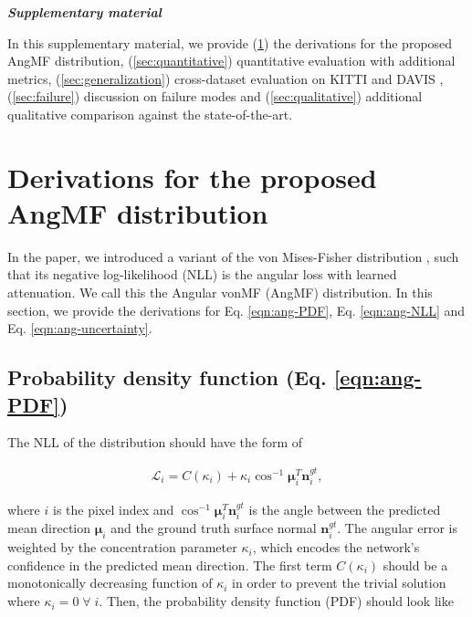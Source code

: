 \documentclass[10pt,twocolumn,letterpaper]{article}
\begin{document}
{\small


}

\appendix
\onecolumn

\noindent
\textit{\textbf{\large Supplementary material}}

\noindent
In this supplementary material, we provide (\ref{sec:derivation}) the derivations for the proposed AngMF distribution, (\ref{sec:quantitative}) quantitative evaluation with additional metrics, (\ref{sec:generalization}) cross-dataset evaluation on KITTI \cite{KITTI} and DAVIS \cite{DAVIS}, (\ref{sec:failure}) discussion on failure modes and (\ref{sec:qualitative}) additional qualitative comparison against the state-of-the-art.


\section{Derivations for the proposed AngMF distribution}
\label{sec:derivation}

In the paper, we introduced a variant of the von Mises-Fisher distribution \cite{fisher1993statistical}, such that its negative log-likelihood (NLL) is the angular loss with learned attenuation. We call this the Angular vonMF (AngMF) distribution. In this section, we provide the derivations for Eq. \ref{eqn:ang-PDF}, Eq. \ref{eqn:ang-NLL} and Eq. \ref{eqn:ang-uncertainty}.

\subsection{Probability density function (Eq. \ref{eqn:ang-PDF})}

The NLL of the distribution should have the form of

\begin{equation}
\begin{aligned}
\label{eqn:supp_new_nll}
\mathcal{L}_i = C(\kappa_i) + \kappa_i \cos^{-1} \boldsymbol{\mu}_i^T \mathbf{n}_i^{gt},
\end{aligned}
\end{equation}

\noindent
where $i$ is the pixel index and $\cos^{-1} \boldsymbol{\mu}_i^T \mathbf{n}_i^{gt}$ is the angle between the predicted mean direction $\boldsymbol{\mu}_i$ and the ground truth surface normal $\mathbf{n}_i^{gt}$. The angular error is weighted by the concentration parameter $\kappa_i$, which encodes the network's confidence in the predicted mean direction. The first term $C(\kappa_i)$ should be a monotonically decreasing function of $\kappa_i$ in order to prevent the trivial solution where $\kappa_i = 0 \; \forall \; i$. Then, the probability density function (PDF) should look like
\end{document}
